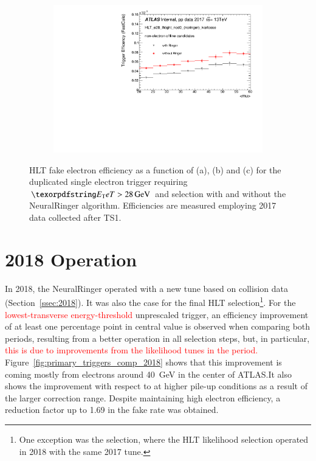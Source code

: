 \begin{figure}[h!tb]
\begin{center}
\begin{subfigure}[c]{.48\textwidth}
\centering
\includegraphics[width=\textwidth]{sections/operation/figures/efficiencies/eff_EGAM7_e28_ringer_and_noringer_2017_after_ts1_mu.pdf}
\caption{}
\end{subfigure}
\caption{HLT fake electron efficiency as a function of \et (a), \eta (b) and
\avgmu (c) for the duplicated single electron trigger requiring $\et >
\SI{28}{\GeV}$ and \tight selection with and without the NeuralRinger algorithm.
Efficiencies are measured employing 2017 data collected after TS1.}%
\label{fig:e28_triggers_fake_hlt}
\end{center}
\end{figure}

\FloatBarrier

\section{2018 Operation}\label{ssec:2018_ringer_operation}

In 2018, the NeuralRinger operated with a new tune based on collision data
(Section~\ref{ssec:2018}). It was also the case for the final HLT
selection\footnote{One exception was the \medium{} selection, where the HLT
likelihood selection operated in 2018 with the same 2017 tune.}. For the
\textcolor{red}{lowest-transverse energy-threshold}
unprescaled trigger, an efficiency
improvement of at least one percentage point in central value is observed when
comparing both periods, resulting from a better operation in all selection
steps, but, in particular,
\textcolor{red}{this is due to improvements from the likelihood tunes in the period.}
Figure~\ref{fig:primary_triggers_comp_2018} shows that this improvement is
coming mostly from electrons around \SI{40}{\GeV} in the center of ATLAS.\@ It
also shows the improvement with respect to \avgmu at higher pile-up conditions
as a result of the larger correction range. Despite maintaining high electron efficiency, a reduction factor up to 1.69 in the \fastcalo{} fake rate was obtained.

